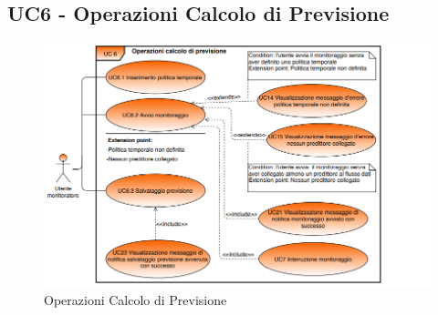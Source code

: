 	\subsection{UC6 - Operazioni Calcolo di Previsione}

	\begin{figure}[H]
		\centering
		\includegraphics[scale=0.70]{../Analisi_dei_requisiti/img/Diagrammi_UML/UC6_Operazioni_Calcolo_di_Previsione.png}
		\caption{Operazioni Calcolo di Previsione}
	\end{figure}	


